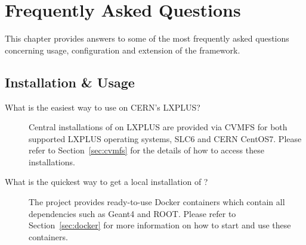 \chapter{Frequently Asked Questions}
\label{ch:faq}

This chapter provides answers to some of the most frequently asked questions concerning usage, configuration and extension of the \apsq framework.

\section{Installation \& Usage}

\begin{description}
\item[What is the easiest way to use \apsq on CERN's LXPLUS?]
Central installations of \apsq on LXPLUS are provided via CVMFS for both supported LXPLUS operating systems, SLC6 and CERN CentOS7. Please refer to Section~\ref{sec:cvmfs} for the details of how to access these installations.
\item[What is the quickest way to get a local installation of \apsq?]
The project provides ready-to-use Docker containers which contain all dependencies such as Geant4 and ROOT. Please refer to Section~\ref{sec:docker} for more information on how to start and use these containers.
\end{description}

